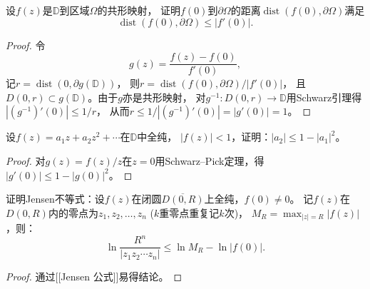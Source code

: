 \begin{5}
    设$f(z)$是$\mathbb{D}$到区域$\Omega$的共形映射，
    证明$f(0)$到$\partial\Omega$的距离$\operatorname{dist}(f(0),\partial\Omega)$满足
    \[\operatorname{dist}(f(0),\partial\Omega)\le|f'(0)|.\]
\end{5}
\begin{proof}
    令\[g(z)=\frac{f(z)-f(0)}{f'(0)},\]
    记$r=\operatorname{dist}(0,\partial g(\mathbb{D}))$，
    则$r=\operatorname{dist}(f(0),\partial\Omega)/|f'(0)|$，
    且$D(0,r) \subset g(\mathbb{D})$。由于$g$亦是共形映射，
    对$g^{-1}\colon D(0,r)\to\mathbb{D}$用Schwarz引理得$|(g^{-1})'(0)|\le1/r$，
    从而$r\le1/|(g^{-1})'(0)|=|g'(0)|=1$。
\end{proof}
\begin{9}
    设$f(z)=a_1z+a_2z^2+\cdots$在$\mathbb{D}$中全纯，
    $|f(z)|<1$，证明：$|a_2|\le1-|a_1|^2$。
\end{9}
\begin{proof}
    对$g(z)=f(z)/z$在$z=0$用Schwarz--Pick定理，得$|g'(0)|\le1-|g(0)|^2$。
\end{proof}
\begin{10}
    证明Jensen不等式：设$f(z)$在闭圆$\overline{D(0,R)}$上全纯，$f(0)\ne0$。
    记$f(z)$在$D(0,R)$内的零点为$z_1,z_2,\dots,z_n$ ($k$重零点重复记$k$次)，
    $M_R=\max_{|z|=R}|f(z)|$，则：
    \[\ln\frac{R^n}{|z_1z_2\cdots z_n|}\le\ln M_R-\ln|f(0)|.\]
\end{10}
\begin{proof}
    通过[[Jensen 公式]]易得结论。
\end{proof}

